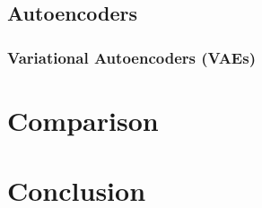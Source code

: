\documentclass[conference]{IEEEtran}
\begin{document}
\subsection{Autoencoders}

\subsubsection{Variational Autoencoders (VAEs)}

\section{Comparison}
\label{comparison}

\section{Conclusion}
\label{conclusion}
\end{document}
